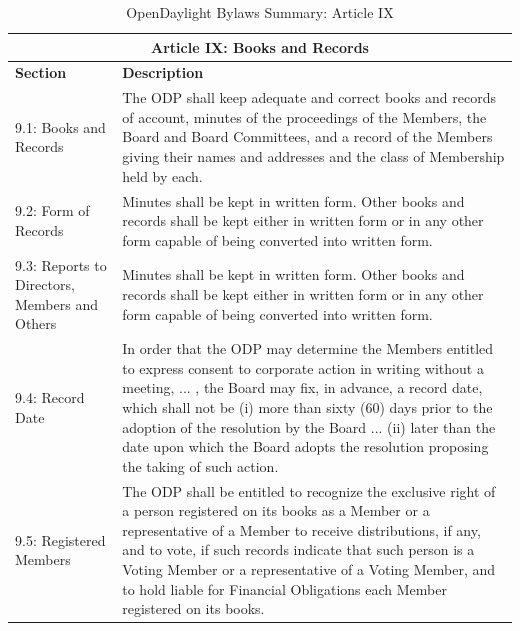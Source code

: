 \documentclass[a4paper, 12pt]{book}
\begin{document}
{\begin{table}[H]
  \begin{center}
    \begin{tabular}{ | p{4cm} | p{11cm} | }
    \toprule
    \multicolumn {2}{|c|}{\textbf{Article IX: Books and Records}} \\
    \hline
    \textbf{Section} & \textbf{Description} \\
    \hline
    9.1: Books and Records & The ODP shall keep adequate and correct books and records of account, minutes of the proceedings of the Members, the Board and Board Committees, and a record of the Members giving their names and addresses and the class of Membership held by each.\\
    \hline
    9.2: Form of Records & Minutes shall be kept in written form.  Other books and records shall be kept either in written form or in any other form capable of being converted into written form.\\
    \hline
    9.3: Reports to Directors, Members and Others & Minutes shall be kept in written form.  Other books and records shall be kept either in written form or in any other form capable of being converted into written form.\\
    \hline
    9.4: Record Date & In order that the ODP may determine the Members entitled to express consent to corporate action in writing without a meeting, ... , the Board may fix, in advance, a record date, which shall not be (i) more than sixty (60) days prior to the adoption of the resolution by the Board ... (ii) later than the date upon which the Board adopts the resolution proposing the taking of such action.\\
    \hline
    9.5: Registered Members & The ODP shall be entitled to recognize the exclusive right of a person registered on its books as a Member or a representative of a Member to receive distributions, if any, and to vote, if such records indicate that such person is a Voting Member or a representative of a Voting Member, and to hold liable for Financial Obligations each Member registered on its books.\\
    \bottomrule
    \end{tabular}
    \caption{OpenDaylight Bylaws Summary: Article IX}
    \label{tab:odlbylaws-art09}
  \end{center}
\end{table}

}
\end{document}
